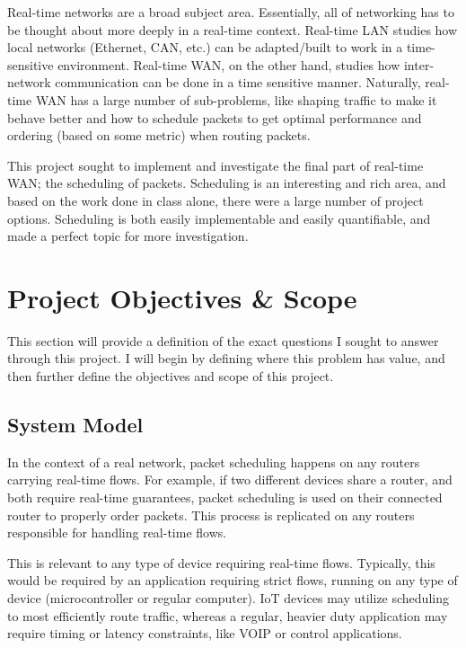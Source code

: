 \documentclass[conference]{IEEEtran}
\begin{document}
    Real-time networks are a broad subject area.
    Essentially, all of networking has to be thought about more deeply in a real-time context.
    Real-time LAN studies how local networks (Ethernet, CAN, etc.) can be adapted/built to work in a time-sensitive environment.
    Real-time WAN, on the other hand, studies how inter-network communication can be done in a time sensitive manner.
    Naturally, real-time WAN has a large number of sub-problems, like shaping traffic to make it behave better and
    how to schedule packets to get optimal performance and ordering (based on some metric) when routing packets.

    This project sought to implement and investigate the final part of real-time WAN; the scheduling of packets.
    Scheduling is an interesting and rich area, and based on the work done in class alone, there were a large number
    of project options.
    Scheduling is both easily implementable and easily quantifiable, and made a perfect topic for more investigation.

    \section{Project Objectives \& Scope}
    This section will provide a definition of the exact questions I sought to answer through this project.
    I will begin by defining where this problem has value, and then further define the objectives and scope of this project.

    \subsection{System Model}
    In the context of a real network, packet scheduling happens on any routers carrying real-time flows.
    For example, if
    two different devices share a router, and both require real-time guarantees, packet scheduling is used on their connected
    router to properly order packets.
    This process is replicated on any routers responsible for handling real-time flows.

    This is relevant to any type of device requiring real-time flows.
    Typically, this would be required by an application requiring strict flows, running on any type of device (microcontroller
    or regular computer).
    IoT devices may utilize scheduling to most efficiently route traffic, whereas a regular, heavier duty application may
    require timing or latency constraints, like VOIP or control applications.
\end{document}
